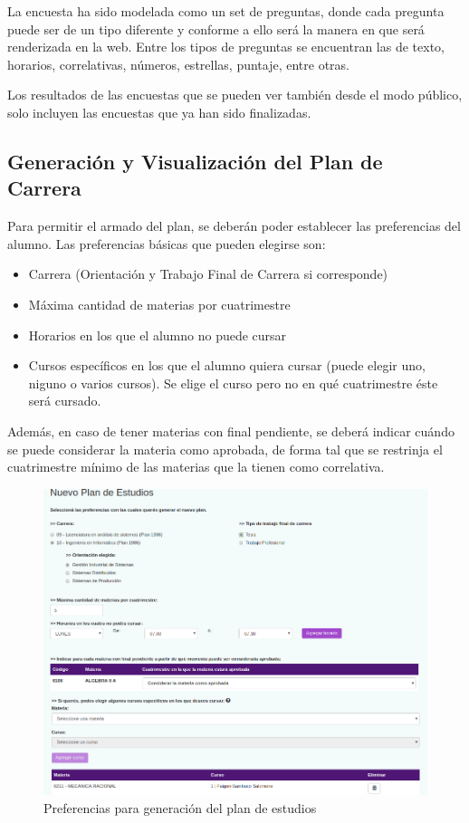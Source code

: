 \documentclass[a4paper]{article}
\begin{document}
La encuesta ha sido modelada como un set de preguntas, donde cada pregunta puede ser de un tipo diferente y conforme a ello será la manera en que será renderizada en la web. Entre los tipos de preguntas se encuentran las de texto, horarios, correlativas, números, estrellas, puntaje, entre otras.\newline

Los resultados de las encuestas que se pueden ver también desde el modo público, solo incluyen las encuestas que ya han sido finalizadas.

\subsection{Generación y Visualización del Plan de Carrera}

Para permitir el armado del plan, se deberán poder establecer las preferencias del alumno. Las preferencias básicas que pueden elegirse son:

\begin{itemize}
	\item Carrera (Orientación y Trabajo Final de Carrera si corresponde)
	\item Máxima cantidad de materias por cuatrimestre
	\item Horarios en los que el alumno no puede cursar
	\item Cursos específicos en los que el alumno quiera cursar (puede elegir uno, niguno o varios cursos). Se elige el curso pero no en qué cuatrimestre éste será cursado.
\end{itemize}

Además, en caso de tener materias con final pendiente, se deberá indicar cuándo se puede considerar la materia como aprobada, de forma tal que se restrinja el cuatrimestre mínimo de las materias que la tienen como correlativa.

\begin{figure}[H]
\centering
\includegraphics[scale=0.35]{Imagenes/preferencias_generacion_plan.png}\par
\caption{Preferencias para generación del plan de estudios}
\end{figure}
\end{document}
